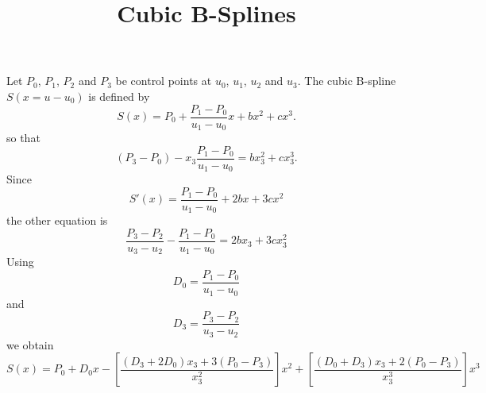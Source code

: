 \documentclass[aps]{revtex4}
\begin{document}
\title{Cubic B-Splines}
\maketitle

Let $P_0$, $P_1$, $P_2$ and $P_3$ be control points at $u_0$, $u_1$, $u_2$ and $u_3$.
The cubic B-spline $S(x=u-u_0)$ is defined by
$$
	S(x) = P_0 + \dfrac{P_1-P_0}{u_1-u_0} x + b x^2 + c x^3.
$$
so that
$$
	(P_3-P_0) - x_3 \dfrac{P_1-P_0}{u_1-u_0} = b x_3^2 + c x_3 ^3.
$$
Since
$$
	S'(x) = \dfrac{P_1-P_0}{u_1-u_0} + 2 b x + 3 c x^2
$$
the other equation is
$$
	\frac{P_3-P_2}{u_3-u_2} - \dfrac{P_1-P_0}{u_1-u_0} = 2 b x_3 + 3 c x_3^2
$$
Using
$$
	D_0 = \dfrac{P_1-P_0}{u_1-u_0}
$$
and
$$
 D_3 = \frac{P_3-P_2}{u_3-u_2}
$$	
we obtain
$$
	S(x) = P_0 + D_0 x - \left[\frac{(D_3+2D_0)x_3 + 3(P_0-P_3)}{x_3^2}\right] x^2
	+ \left[ \frac{(D_0+D_3)x_3 + 2(P_0-P_3)}{x_3^3}\right] x^3
$$
\end{document}
